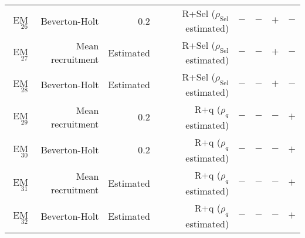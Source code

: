 \begin{center}
\begin{tabular}{rrrrrrrr}
EM$_{26}$&Beverton-Holt&0.2&R+Sel ($\rho_{\text{Sel}}$ estimated)&$-$&$-$&$+$&$-$\tabularnewline
EM$_{27}$&Mean recruitment&Estimated&R+Sel ($\rho_{\text{Sel}}$ estimated)&$-$&$-$&$+$&$-$\tabularnewline
EM$_{28}$&Beverton-Holt&Estimated&R+Sel ($\rho_{\text{Sel}}$ estimated)&$-$&$-$&$+$&$-$\tabularnewline
EM$_{29}$&Mean recruitment&0.2&R+q ($\rho_{q}$ estimated)&$-$&$-$&$-$&$+$\tabularnewline
EM$_{30}$&Beverton-Holt&0.2&R+q ($\rho_{q}$ estimated)&$-$&$-$&$-$&$+$\tabularnewline
EM$_{31}$&Mean recruitment&Estimated&R+q ($\rho_{q}$ estimated)&$-$&$-$&$-$&$+$\tabularnewline
EM$_{32}$&Beverton-Holt&Estimated&R+q ($\rho_{q}$ estimated)&$-$&$-$&$-$&$+$\tabularnewline
\hline
\end{tabular}\end{center}
